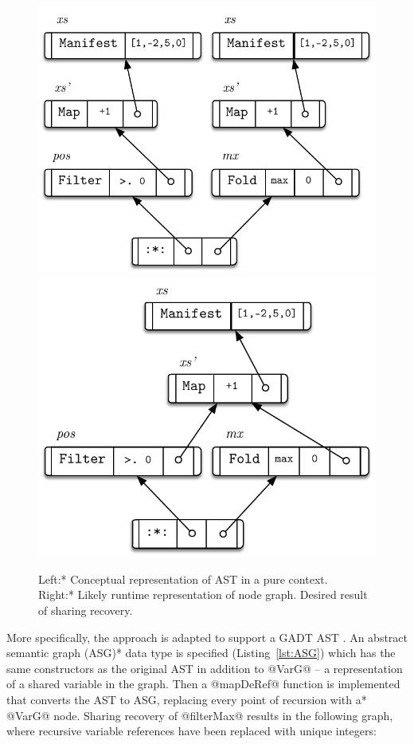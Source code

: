 \documentclass[preamble.tex]{subfiles}
\begin{document}
\begin{figure}
\includegraphics[scale=0.7]{img/AST-Flat-FilterMax-Unshared}%
\includegraphics[scale=0.7]{img/AST-Flat-FilterMax-Shared}
\caption{\*Left:* Conceptual representation of  AST in a pure context.\\\*Right:* Likely runtime representation of  node graph. Desired result of sharing recovery.}
\label{fig:Flat-FilterMax-Sharing}
\end{figure}

More specifically, the approach is adapted to support a GADT AST \cite{GADTSharing}. An \*abstract semantic graph (ASG)* data type is specified (Listing~\ref{lst:ASG}) which has the same constructors as the original AST in addition to @VarG@ -- a representation of a shared variable in the graph. Then a @mapDeRef@ function is implemented that converts the AST to ASG, \*replacing every point of recursion with a* @VarG@ node. Sharing recovery of @filterMax@ results in the following graph, where recursive variable references have been replaced with unique integers:
\end{document}
